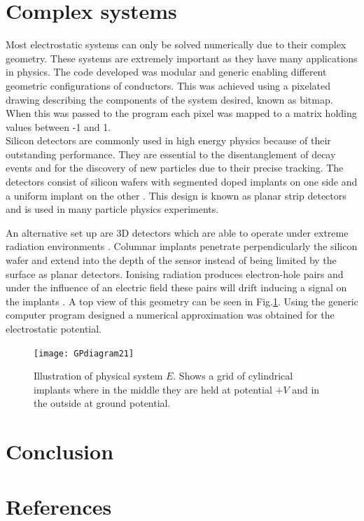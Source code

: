 \documentclass[a4paper]{jpconf}
\begin{document}
\section*{Complex systems}
Most electrostatic systems can only be solved numerically due to their complex geometry. These systems are extremely important as they have many applications in physics.
The code developed was modular and generic enabling different geometric configurations of conductors. This was achieved using a pixelated drawing describing the components of the system desired, known as bitmap. When this was passed to the program each pixel was mapped to a matrix holding values between -1 and 1. \\ %

Silicon detectors are commonly used in high energy physics because of their outstanding performance.  They are essential to the disentanglement of decay events and for the discovery of new particles due to their precise tracking. The detectors consist of silicon wafers with segmented doped implants on one side and a uniform implant on the other \cite{kohlerPH}. This design is known as planar strip detectors and is used in many particle physics experiments. \par
An alternative set up are 3D detectors which are able to operate under extreme radiation environments \cite{kohlerPH}.
Columnar implants penetrate perpendicularly the silicon wafer and extend into the depth of the sensor instead of being limited by the surface as planar detectors. Ionising radiation produces electron-hole pairs and under the influence of an electric field these pairs will drift inducing a signal on the implants \cite{GK-radiationDetection}. 
A top view of this geometry can be seen in Fig.\ref{fig:systemE}. Using the generic computer program designed a numerical approximation was obtained for the electrostatic potential.

\begin{figure}[h]
	\centering
	\texttt{[image: GPdiagram21]} 
	\caption{Illustration of physical system $E$. Shows a grid of cylindrical implants where in the middle they are held at potential $+V$ and in the outside at ground potential.}
	\label{fig:systemE}
\end{figure}






\section*{Conclusion}

\section*{References}


\end{document}
